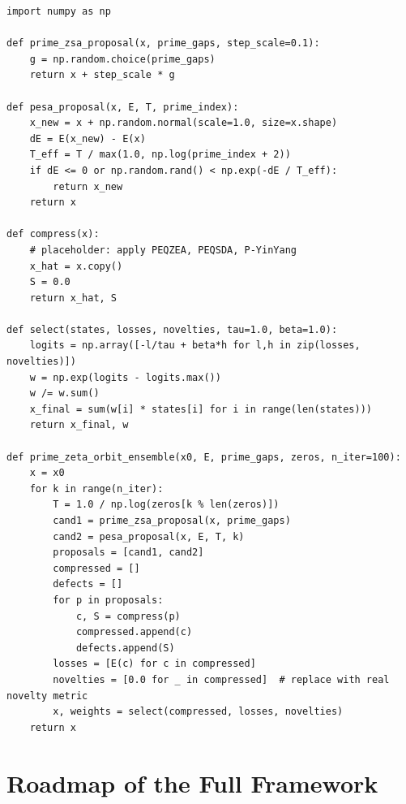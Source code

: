 \documentclass[11pt]{article}
\theoremstyle{definition}
\theoremstyle{plain}
\theoremstyle{remark}
\begin{document}
\begin{verbatim}
import numpy as np

def prime_zsa_proposal(x, prime_gaps, step_scale=0.1):
    g = np.random.choice(prime_gaps)
    return x + step_scale * g

def pesa_proposal(x, E, T, prime_index):
    x_new = x + np.random.normal(scale=1.0, size=x.shape)
    dE = E(x_new) - E(x)
    T_eff = T / max(1.0, np.log(prime_index + 2))
    if dE <= 0 or np.random.rand() < np.exp(-dE / T_eff):
        return x_new
    return x

def compress(x):
    # placeholder: apply PEQZEA, PEQSDA, P-YinYang
    x_hat = x.copy()
    S = 0.0
    return x_hat, S

def select(states, losses, novelties, tau=1.0, beta=1.0):
    logits = np.array([-l/tau + beta*h for l,h in zip(losses, novelties)])
    w = np.exp(logits - logits.max())
    w /= w.sum()
    x_final = sum(w[i] * states[i] for i in range(len(states)))
    return x_final, w

def prime_zeta_orbit_ensemble(x0, E, prime_gaps, zeros, n_iter=100):
    x = x0
    for k in range(n_iter):
        T = 1.0 / np.log(zeros[k % len(zeros)])
        cand1 = prime_zsa_proposal(x, prime_gaps)
        cand2 = pesa_proposal(x, E, T, k)
        proposals = [cand1, cand2]
        compressed = []
        defects = []
        for p in proposals:
            c, S = compress(p)
            compressed.append(c)
            defects.append(S)
        losses = [E(c) for c in compressed]
        novelties = [0.0 for _ in compressed]  # replace with real novelty metric
        x, weights = select(compressed, losses, novelties)
    return x
\end{verbatim}

\section{Roadmap of the Full Framework}
\end{document}
